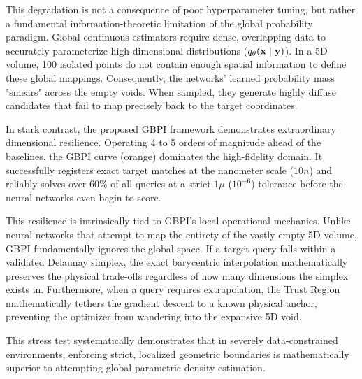 This degradation is not a consequence of poor hyperparameter tuning, but rather a fundamental information-theoretic limitation of the global probability paradigm. Global continuous estimators require dense, overlapping data to accurately parameterize high-dimensional distributions ($q_\theta(\mathbf{x}\mid\mathbf{y})$). In a 5D volume, 100 isolated points do not contain enough spatial information to define these global mappings. Consequently, the networks' learned probability mass "smears" across the empty voids. When sampled, they generate highly diffuse candidates that fail to map precisely back to the target coordinates.

In stark contrast, the proposed GBPI framework demonstrates extraordinary dimensional resilience. Operating 4 to 5 orders of magnitude ahead of the baselines, the GBPI curve (orange) dominates the high-fidelity domain. It successfully registers exact target matches at the nanometer scale ($10n$) and reliably solves over 60\% of all queries at a strict $1\mu$ ($10^{-6}$) tolerance before the neural networks even begin to score.

This resilience is intrinsically tied to GBPI's local operational mechanics. Unlike neural networks that attempt to map the entirety of the vastly empty 5D volume, GBPI fundamentally ignores the global space. If a target query falls within a validated Delaunay simplex, the exact barycentric interpolation mathematically preserves the physical trade-offs regardless of how many dimensions the simplex exists in. Furthermore, when a query requires extrapolation, the Trust Region mathematically tethers the gradient descent to a known physical anchor, preventing the optimizer from wandering into the expansive 5D void. 

This stress test systematically demonstrates that in severely data-constrained environments, enforcing strict, localized geometric boundaries is mathematically superior to attempting global parametric density estimation.



